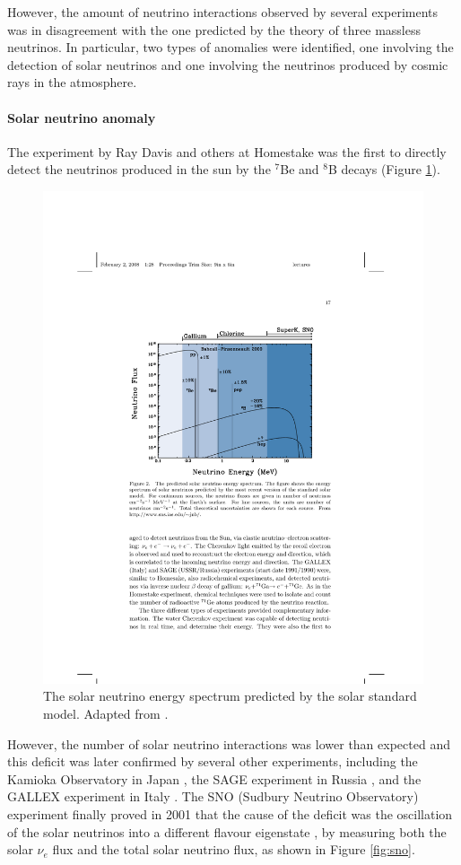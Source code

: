 However, the amount of neutrino interactions observed by several experiments was in disagreement with the one predicted by the theory of three massless neutrinos. In particular, two types of anomalies were identified, one involving the detection of solar neutrinos and one involving the neutrinos produced by cosmic rays in the atmosphere.

\paragraph{Solar neutrino anomaly}
The experiment by Ray Davis and others at Homestake was the first to directly detect the neutrinos produced in the sun \cite{Davis:1968cp} by the $^7$Be and $^8$B decays (Figure \ref{fig:solar}). 

\begin{figure}[htbp]
    \centering
    \includegraphics[width=0.75\linewidth]{figures/solar.pdf}
    \caption{The solar neutrino energy spectrum predicted by the solar standard model. Adapted from \cite{Bahcall:2000nu}.}
    \label{fig:solar}
\end{figure}

However, the number of solar neutrino interactions was lower than expected and this deficit was later confirmed by several other experiments, including the Kamioka Observatory in Japan \cite{Hirata:1989zj}, the SAGE experiment in Russia \cite{Abdurashitov:1994bc}, and the GALLEX experiment in Italy \cite{Hampel:1998xg}. The SNO (Sudbury Neutrino Observatory) experiment finally proved in 2001 that the cause of the deficit was the oscillation of the solar neutrinos into a different flavour eigenstate \cite{Ahmad:2002jz}, by measuring both the solar $\nu_{e}$ flux and the total solar neutrino flux, as shown in Figure \ref{fig:sno}. 

